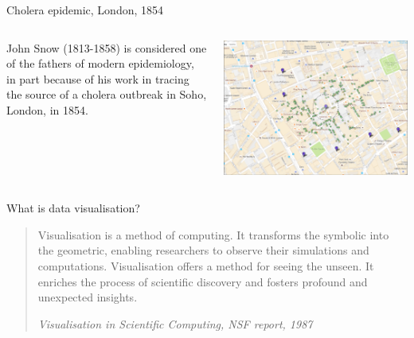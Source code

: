 \documentclass[10pt,aspectratio=169]{beamer}
\begin{document}
\begin{frame}{Cholera epidemic, London, 1854}
  \begin{columns}
    \begin{column}{.3\textwidth}
      John Snow (1813-1858) is considered one of the fathers of modern
      epidemiology, in part because of his work in tracing the source of a
      cholera outbreak in Soho, London, in 1854.
    \end{column}
    \begin{column}{.6\textwidth}
      \includegraphics[width=\textwidth]{cholera-modern.png}
    \end{column}
  \end{columns}
\end{frame}

\begin{frame}{What is data visualisation?}
  \begin{quote}
    Visualisation is a method of computing. It transforms the symbolic into the
    geometric, enabling researchers to observe their simulations and
    computations. Visualisation offers a method for seeing the unseen. It
    enriches the process of scientific discovery and fosters profound and
    unexpected insights.
    \begin{flushright}
      \em \small Visualisation in Scientific Computing, NSF report, 1987
    \end{flushright}
  \end{quote}
\end{frame}
\end{document}
